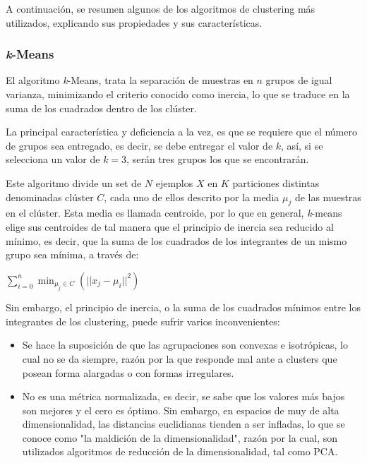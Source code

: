 A continuación, se resumen algunos de los algoritmos de clustering más utilizados, explicando sus propiedades y sus características.

\subsubsection{\textit{k}-Means}

El algoritmo \textit{k}-Means, trata la separación de muestras en $ n $ grupos de igual varianza, minimizando el criterio conocido como inercia, lo que se traduce en la suma de los cuadrados dentro de los clúster.

La principal característica y deficiencia a la vez, es que se requiere que el número de grupos sea entregado, es decir, se debe entregar el valor de $k$, así, si se selecciona un valor de $k = 3$, serán tres grupos los que se encontrarán. 

Este algoritmo divide un set de $N$ ejemplos $X$ en $K$ particiones distintas denominadas clúster $C$, cada uno de ellos descrito por la media $\mu_{j}$ de las muestras en el clúster. Esta media es llamada centroide, por lo que en general, \textit{k}-means  elige sus centroides de tal manera que el principio de inercia sea reducido al mínimo, es decir, que la suma de los cuadrados de los integrantes de un mismo grupo sea mínima, a través de:

\begin{center}
	$\sum_{i=0}^{n} \min_{\mu_{j} \in C} (|| x_{j}-\mu_{i}||^{2})$
\end{center}

Sin embargo, el principio de inercia, o la suma de los cuadrados mínimos entre los integrantes de los clustering, puede sufrir varios inconvenientes:

\begin{itemize}
	\item Se hace la suposición de que las agrupaciones son convexas e isotrópicas, lo cual no se da siempre, razón por la que responde mal ante a clusters que posean forma alargadas o con formas irregulares.
	
	\item No es una métrica normalizada, es decir, se sabe que los valores más bajos son mejores y el cero es óptimo. Sin embargo, en espacios de muy de alta dimensionalidad, las distancias euclidianas tienden a ser infladas, lo que se conoce como  "la maldición de la dimensionalidad", razón por la cual, son utilizados algoritmos de reducción de la dimensionalidad, tal como PCA.
	
\end{itemize}

